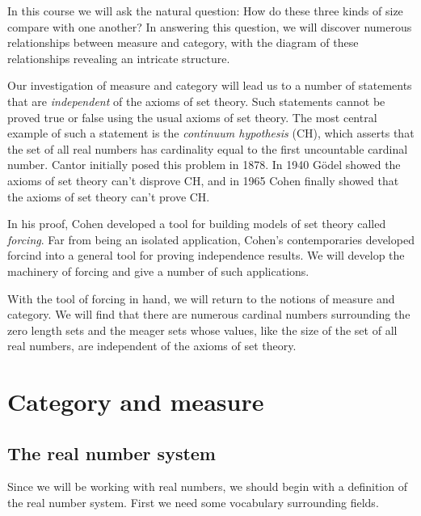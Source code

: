 \documentclass[11pt,oneside,a4paper]{amsbook}
\theoremstyle{definition}
\theoremstyle{plain}
\theoremstyle{definition}
\theoremstyle{remark}
\numberwithin{equation}{section}
\numberwithin{figure}{section}
\begin{document}
In this course we will ask the natural question: How do these three kinds of size compare with one another? In answering this question, we will discover numerous relationships between measure and category, with the diagram of these relationships revealing an intricate structure.

Our investigation of measure and category will lead us to a number of statements that are \emph{independent} of the axioms of set theory. Such statements cannot be proved true or false using the usual axioms of set theory. The most central example of such a statement is the \emph{continuum hypothesis} (CH), which asserts that the set of all real numbers has cardinality equal to the first uncountable cardinal number. Cantor initially posed this problem in 1878. In 1940 G\"odel showed the axioms of set theory can't disprove CH, and in 1965 Cohen finally showed that the axioms of set theory can't prove CH.

In his proof, Cohen developed a tool for building models of set theory called \emph{forcing}. Far from being an isolated application, Cohen's contemporaries developed forcind into a general tool for proving independence results. We will develop the machinery of forcing and give a number of such applications.

With the tool of forcing in hand, we will return to the notions of measure and category. We will find that there are numerous cardinal numbers surrounding the zero length sets and the meager sets whose values, like the size of the set of all real numbers, are independent of the axioms of set theory.


\chapter{Category and measure}

\section{The real number system}

Since we will be working with real numbers, we should begin with a definition of the real number system. First we need some vocabulary surrounding fields.
\end{document}
